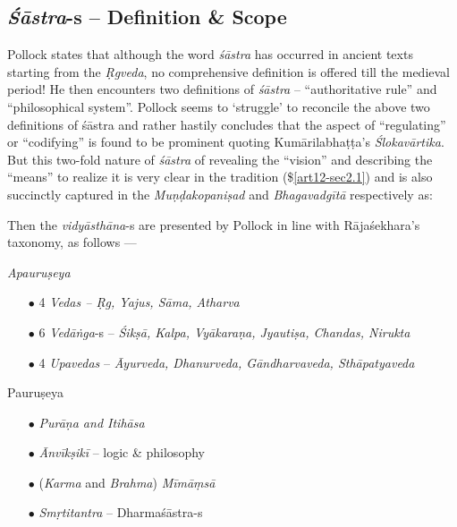\subsection{{{\sl\bfseries Śāstra}\relax}-s -- Definition \& Scope}\label{art12-sec3.4}

Pollock states that although the word {\sl śāstra} has occurred in ancient texts starting from the {\sl Ṛgveda}, no comprehensive deﬁnition is oﬀered till the medieval period! He then encounters two deﬁnitions of {\sl śāstra} -- ``authoritative rule'' and ``philosophical system''. Pollock seems to `struggle' to reconcile the above two deﬁnitions of śāstra and rather hastily concludes that the aspect of ``regulating'' or ``codifying'' is found to be prominent quoting Kumārilabhaṭṭa's   {\sl Ślokavārtika}. But this two-fold nature of {\sl śāstra} of revealing the ``vision'' and describing the ``means'' to realize it is very clear in the tradition (\$\ref{art12-sec2.1}) and is also succinctly captured in the {\sl Muṇḍakopaniṣad} and {\sl Bhagavadgītā} respectively as: 

Then the {\sl vidyāsthāna}-s are presented by Pollock in line with Rājaśekhara's taxonomy, as follows ---

{\sl Apauruṣeya}
\begin{itemize}
\item[$\bullet$] 4 {\sl Vedas -- Ṛg, Yajus, Sāma, Atharva}

\item[$\bullet$] 6 {\sl Vedāṅga}-s -- {\sl Śikṣā, Kalpa, Vyākaraṇa, Jyautiṣa, Chandas, Nirukta}

\item[$\bullet$] 4 {\sl Upavedas} -- {\sl Āyurveda, Dhanurveda, Gāndharvaveda, Sthāpatyaveda}
\end{itemize}

Pauruṣeya
\begin{itemize}
\item[$\bullet$] {\sl Purāṇa and Itihāsa}

\item[$\bullet$] {\sl Ānvīkṣikī} -- logic \& philosophy

\item[$\bullet$] ({\sl Karma} and {\sl Brahma}) {\sl Mīmāṃsā}

\item[$\bullet$] {\sl Smṛtitantra} -- Dharmaśāstra-s
\end{itemize}

